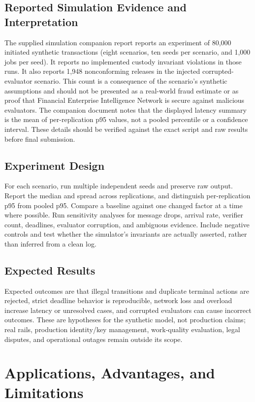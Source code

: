 \documentclass[12pt,a4paper,oneside]{report}
\begin{document}
\section{Reported Simulation Evidence and Interpretation}
The supplied simulation companion report \cite{feinsimcompanion} reports an experiment of 80,000 initiated synthetic transactions (eight scenarios, ten seeds per scenario, and 1,000 jobs per seed). It reports no implemented custody invariant violations in those runs. It also reports 1,948 nonconforming releases in the injected corrupted-evaluator scenario. This count is a consequence of the scenario's synthetic assumptions and should not be presented as a real-world fraud estimate or as proof that Financial Enterprise Intelligence Network is secure against malicious evaluators. The companion document notes that the displayed latency summary is the mean of per-replication p95 values, not a pooled percentile or a confidence interval. These details should be verified against the exact script and raw results before final submission.

\section{Experiment Design}
For each scenario, run multiple independent seeds and preserve raw output. Report the median and spread across replications, and distinguish per-replication p95 from pooled p95. Compare a baseline against one changed factor at a time where possible. Run sensitivity analyses for message drops, arrival rate, verifier count, deadlines, evaluator corruption, and ambiguous evidence. Include negative controls and test whether the simulator's invariants are actually asserted, rather than inferred from a clean log.

\section{Expected Results}
Expected outcomes are that illegal transitions and duplicate terminal actions are rejected, strict deadline behavior is reproducible, network loss and overload increase latency or unresolved cases, and corrupted evaluators can cause incorrect outcomes. These are hypotheses for the synthetic model, not production claims; real rails, production identity/key management, work-quality evaluation, legal disputes, and operational outages remain outside its scope.

\chapter{Applications, Advantages, and Limitations}
\end{document}
